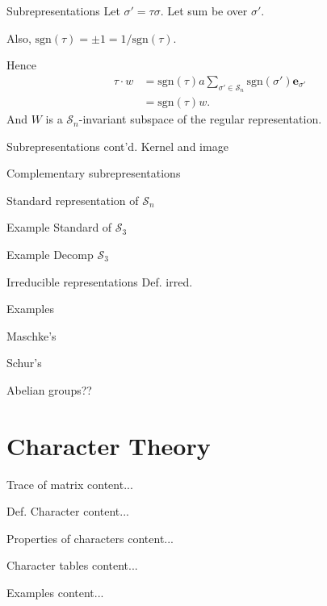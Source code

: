 \documentclass[handout, 10pt]{beamer}
\newcommand{\Sym}{\mathcal{S}}
\newcommand{\sgn}{\text{sgn}}
\newcommand{\bas}{\mathbf{e}}
\begin{document}
\begin{frame}[allowframebreaks]{Subrepresentations}
		Let $\sigma' = \tau\sigma$. Let sum be over $\sigma'$.
		
		Also, $\sgn(\tau) = \pm 1 = 1/\sgn(\tau)$.
		
		Hence \begin{align*}
			\tau \cdot w &= {\sgn(\tau)}a\sum_{\sigma' \in \Sym_n} \sgn(\sigma')\bas_{\sigma'} \\
			&= \sgn(\tau) w.
		\end{align*}
		And $W$ is a $\Sym_n$-invariant subspace of the regular representation.
	\end{frame}
	
	\begin{frame}{Subrepresentations cont'd.}
		Kernel and image
		
		Complementary subrepresentations
		
		Standard representation of $\Sym_n$
		
		Example Standard of $\Sym_3$
		
		Example Decomp $\Sym_3$
		
	\end{frame}
	
	\begin{frame}{Irreducible representations}
		Def. irred.
		
		Examples
		
		Maschke's
		
		Schur's
		
		Abelian groups??
	\end{frame}
	
	\section{Character Theory}
	
	\begin{frame}{Trace of matrix}
		content...
	\end{frame}
	
	\begin{frame}{Def. Character}
		content...
	\end{frame}
	
	\begin{frame}{Properties of characters}
		content...
	\end{frame}
	
	\begin{frame}{Character tables}
		content...
	\end{frame}
	
	\begin{frame}{Examples}
		content...
	\end{frame}
	
\end{document}

